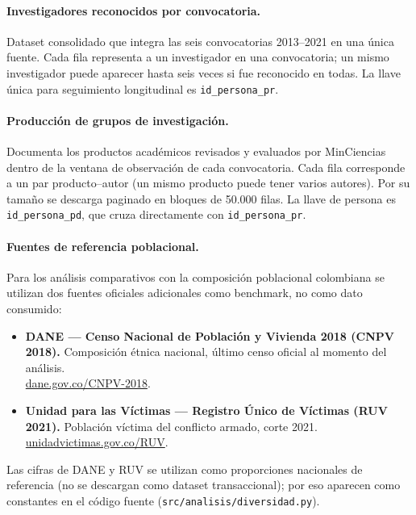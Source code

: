 \documentclass[11pt,a4paper,oneside]{article}
\begin{document}
\paragraph{Investigadores reconocidos por convocatoria.}
Dataset consolidado que integra las seis convocatorias 2013--2021 en una única fuente. Cada fila representa a un investigador en una convocatoria; un mismo investigador puede aparecer hasta seis veces si fue reconocido en todas. La llave única para seguimiento longitudinal es \texttt{id\_persona\_pr}.

\paragraph{Producción de grupos de investigación.}
Documenta los productos académicos revisados y evaluados por MinCiencias dentro de la ventana de observación de cada convocatoria. Cada fila corresponde a un par producto--autor (un mismo producto puede tener varios autores). Por su tamaño se descarga paginado en bloques de 50.000 filas. La llave de persona es \texttt{id\_persona\_pd}, que cruza directamente con \texttt{id\_persona\_pr}.

\paragraph{Fuentes de referencia poblacional.}
Para los análisis comparativos con la composición poblacional colombiana se utilizan dos fuentes oficiales adicionales como benchmark, no como dato consumido:

\begin{itemize}
\item \textbf{DANE --- Censo Nacional de Población y Vivienda 2018 (CNPV 2018).} Composición étnica nacional, último censo oficial al momento del análisis. \\
\href{https://www.dane.gov.co/index.php/estadisticas-por-tema/demografia-y-poblacion/censo-nacional-de-poblacion-y-vivenda-2018}{dane.gov.co/CNPV-2018}.
\item \textbf{Unidad para las Víctimas --- Registro Único de Víctimas (RUV 2021).} Población víctima del conflicto armado, corte 2021. \\
\href{https://www.unidadvictimas.gov.co/es/registro-unico-de-victimas-ruv/37394}{unidadvictimas.gov.co/RUV}.
\end{itemize}

Las cifras de DANE y RUV se utilizan como proporciones nacionales de referencia (no se descargan como dataset transaccional); por eso aparecen como constantes en el código fuente (\texttt{src/analisis/diversidad.py}).
\end{document}
